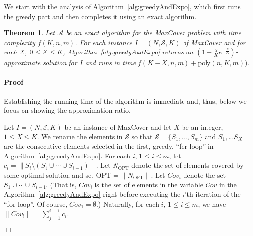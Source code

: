 \documentclass[11pt]{article}
\newcommand{\OPT}{{{{\mathrm{OPT}}}}}
\newcommand{\poly}{{\mathrm{poly}}}
\newcommand{\Cov}{{{\mathit{Cov}}}}
\newtheorem{theorem}{Theorem}
\newenvironment{proof}{\paragraph{Proof}}{\hfill$\Box$\medskip}
\newcommand{\calA}{{{\mathcal{A}}}}
\newcommand{\calS}{{{\mathcal{S}}}}
\begin{document}
We start with the analysis of Algorithm~\ref{alg:greedyAndExpo}, which
first runs the greedy part and then completes it using an exact
algorithm.

\begin{theorem}\label{thm:greedyAndExpo}
  Let $\calA$ be an exact algorithm for the MaxCover problem with time
  complexity $f(K,n, m)$.  For each instance $I = (N,\calS,K)$ of
  MaxCover and for each $X$, $0 \leq X \leq K$,
  Algorithm~\ref{alg:greedyAndExpo} returns an $\left(1 -
    \frac{X}{K}e^{-\frac{X}{K}}\right)$-approximate solution for $I$
  and runs in time $f(K-X,n, m) + \poly(n,K,m))$.
\end{theorem}
\begin{proof}
  Establishing the running time of the algorithm is immediate and,
  thus, below we focus on showing the approximation ratio.

  Let $I = (N,\calS,K)$ be an instance of MaxCover and let $X$ be an
  integer, $1 \leq X \leq K$.  We rename the elements in $\calS$ so
  that $\calS = \{S_1, \ldots, S_m\}$ and $S_1, \dots S_X$ are the
  consecutive elements selected in the first, greedy, ``for loop'' in
  Algorithm~\ref{alg:greedyAndExpo}.  For each $i$, $1 \leq i \leq m$,
  let $c_i = \|S_i \setminus (S_1 \cup \cdots \cup S_{i-1})\|$.  Let
  $N_{\OPT}$ denote the set of elements covered by some optimal
  solution and set $\OPT = \|N_{\OPT}\|$. Let $\Cov_i$ denote the set
  $S_1 \cup \cdots \cup S_{i-1}$. (That is, $\Cov_i$ is the set of
  elements in the variable $\Cov$ in the
  Algorithm~\ref{alg:greedyAndExpo} right before executing the $i$'th
  iteration of the ``for loop''. Of course, $\Cov_1 = \emptyset$.)
  Naturally, for each $i$, $1 \leq i \leq m$, we have $\|\Cov_i\| =
  \sum_{j=1}^{i-1}c_i$.


\end{proof}
\end{document}
